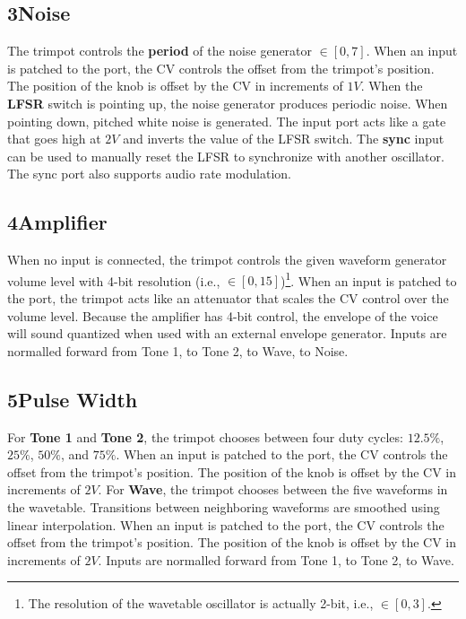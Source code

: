 \documentclass[12pt,letter]{article}
\begin{document}
\subsection*{3{\quad}Noise}

The trimpot controls the \textbf{period} of the noise generator $\in [0, 7]$. When an input is patched to the port, the CV controls the offset from the trimpot's position. The position of the knob is offset by the CV in increments of $1V$. When the \textbf{LFSR} switch is pointing up, the noise generator produces periodic noise. When pointing down, pitched white noise is generated. The input port acts like a gate that goes high at $2V$ and inverts the value of the LFSR switch. The \textbf{sync} input can be used to manually reset the LFSR to synchronize with another oscillator. The sync port also supports audio rate modulation.

\subsection*{4{\quad}Amplifier}

When no input is connected, the trimpot controls the given waveform generator volume level with 4-bit resolution (i.e., $\in [0, 15]$)\footnote{The resolution of the wavetable oscillator is actually 2-bit, i.e., $\in [0, 3]$.}. When an input is patched to the port, the trimpot acts like an attenuator that scales the CV control over the volume level. Because the amplifier has 4-bit control, the envelope of the voice will sound quantized when used with an external envelope generator. Inputs are normalled forward from Tone 1, to Tone 2, to Wave, to Noise.

\subsection*{5{\quad}Pulse Width}

For \textbf{Tone 1} and \textbf{Tone 2}, the trimpot chooses between four duty cycles: $12.5\%$, $25\%$, $50\%$, and $75\%$. When an input is patched to the port, the CV controls the offset from the trimpot's position. The position of the knob is offset by the CV in increments of $2V$. For \textbf{Wave}, the trimpot chooses between the five waveforms in the wavetable. Transitions between neighboring waveforms are smoothed using linear interpolation. When an input is patched to the port, the CV controls the offset from the trimpot's position. The position of the knob is offset by the CV in increments of $2V$. Inputs are normalled forward from Tone 1, to Tone 2, to Wave.
\end{document}
